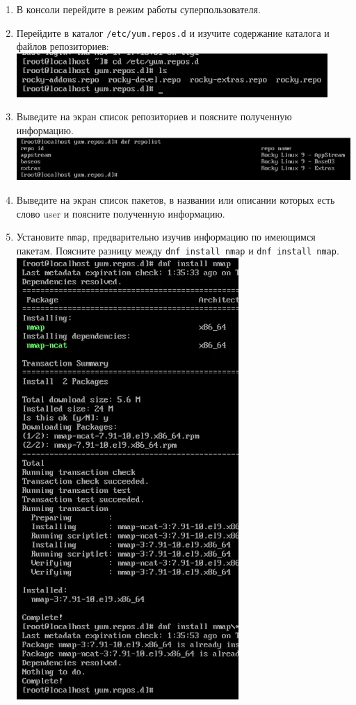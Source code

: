 \documentclass[12pt]{article}
\begin{document}
\begin{enumerate}
	\item В консоли перейдите в режим работы суперпользователя.
	\item Перейдите в каталог \texttt{/etc/yum.repos.d} и изучите содержание каталога и файлов репозиториев:
	      \\\includegraphics{1.png}
	\item Выведите на экран список репозиториев и поясните полученную информацию.
	      \\\includegraphics{2.png}
	\item Выведите на экран список пакетов, в названии или описании которых есть слово user и поясните полученную информацию.
	\item Установите \texttt{nmap}, предварительно изучив информацию по имеющимся пакетам. Поясните разницу между \texttt{dnf install nmap} и \texttt{dnf install nmap\*}.
	      \\\includegraphics{3.png}

\end{enumerate}
\end{document}
